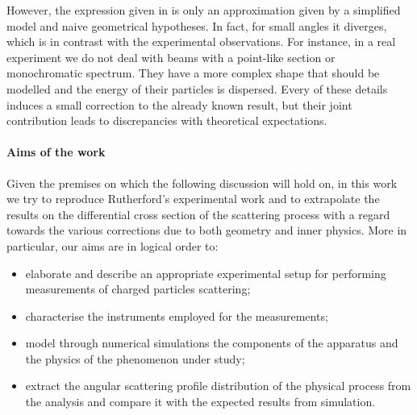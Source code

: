 \documentclass[../../main/main.tex]{subfiles}
\begin{document}
However, the expression given in  is only an approximation given by a simplified model and naive geometrical hypotheses. In fact, for small angles it diverges, which is in contrast with the experimental observations.
For instance, in a real experiment we do not deal with beams with a point-like section or monochromatic spectrum. They have a more complex shape that should be modelled and the energy of their particles is dispersed. Every of these details induces a small correction to the already known result, but their joint contribution leads to discrepancies with theoretical expectations.


\paragraph{Aims of the work}
Given the premises on which the following discussion will hold on, in this work we try to reproduce Rutherford's experimental work and to extrapolate the results on the differential cross section of the scattering process with a regard towards the various corrections due to both geometry and inner physics. More in particular, our aims are in logical order to:
\begin{itemize}
    \item elaborate and describe an appropriate experimental setup for performing measurements of charged particles scattering;
    \item characterise the instruments employed for the measurements;
    \item model through numerical simulations the components of the apparatus and the physics of the phenomenon under study;
    \item extract the angular scattering profile distribution of the physical process from the analysis and compare it with the expected results from simulation.
\end{itemize}
\end{document}
